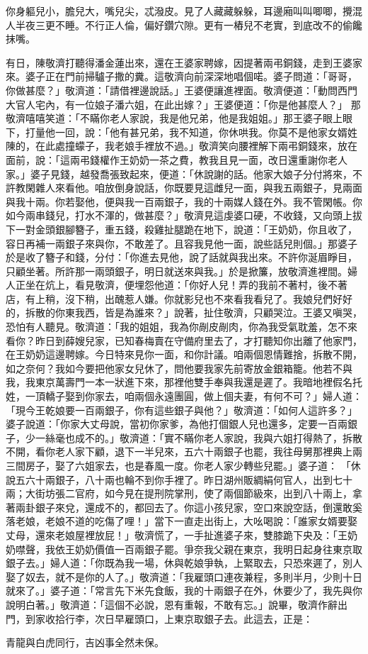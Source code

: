 你身軀兒小，膽兒大，嘴兒尖，忒潑皮。見了人藏藏躲躲，耳邊廂叫叫唧唧，攪混人半夜三更不睡。不行正人倫，偏好鑽穴隙。更有一樁兒不老實，到底改不的偷饞抹嘴。

有日，陳敬濟打聽得潘金蓮出來，還在王婆家聘嫁，因提著兩弔銅錢，走到王婆家來。婆子正在門前掃驢子撒的糞。這敬濟向前深深地唱個喏。婆子問道：「哥哥，你做甚麼？」敬濟道：「請借裡邊說話。」王婆便讓進裡面。敬濟便道：「動問西門大官人宅內，有一位娘子潘六姐，在此出嫁？」王婆便道：「你是他甚麼人？」 那敬濟嘻嘻笑道：「不瞞你老人家說，我是他兄弟，他是我姐姐。」那王婆子眼上眼下，打量他一回，說：「他有甚兄弟，我不知道，你休哄我。你莫不是他家女婿姓陳的，在此處撞蠓子，我老娘手裡放不過。」敬濟笑向腰裡解下兩弔銅錢來，放在面前，說：「這兩弔錢權作王奶奶一茶之費，教我且見一面，改日還重謝你老人家。」婆子見錢，越發喬張致起來，便道：「休說謝的話。他家大娘子分付將來，不許教閑雜人來看他。咱放倒身說話，你既要見這雌兒一面，與我五兩銀子，見兩面與我十兩。你若娶他，便與我一百兩銀子，我的十兩媒人錢在外。我不管閑帳。你如今兩串錢兒，打水不渾的，做甚麼？」敬濟見這虔婆口硬，不收錢，又向頭上拔下一對金頭銀腳簪子，重五錢，殺雞扯腿跪在地下，說道：「王奶奶，你且收了，容日再補一兩銀子來與你，不敢差了。且容我見他一面，說些話兒則個。」那婆子於是收了簪子和錢，分付：「你進去見他，說了話就與我出來。不許你涎眉睜目，只顧坐著。所許那一兩頭銀子，明日就送來與我。」於是掀簾，放敬濟進裡間。婦人正坐在炕上，看見敬濟，便埋怨他道：「你好人兒！弄的我前不著村，後不著店，有上稍，沒下稍，出醜惹人嫌。你就影兒也不來看我看兒了。我娘兒們好好的，拆散的你東我西，皆是為誰來？」說著，扯住敬濟，只顧哭泣。王婆又嗔哭，恐怕有人聽見。敬濟道：「我的姐姐，我為你剮皮剮肉，你為我受氣耽羞，怎不來看你？昨日到薛嫂兒家，已知春梅賣在守備府里去了，才打聽知你出離了他家門，在王奶奶這邊聘嫁。今日特來見你一面，和你計議。咱兩個恩情難捨，拆散不開，如之奈何？我如今要把他家女兒休了，問他要我家先前寄放金銀箱籠。他若不與我，我東京萬壽門一本一狀進下來，那裡他雙手奉與我還是遲了。我暗地裡假名托姓，一頂轎子娶到你家去，咱兩個永遠團圓，做上個夫妻，有何不可？」婦人道：「現今王乾娘要一百兩銀子，你有這些銀子與他？」敬濟道：「如何人這許多？」 婆子說道：「你家大丈母說，當初你家爹，為他打個銀人兒也還多，定要一百兩銀子，少一絲毫也成不的。」敬濟道：「實不瞞你老人家說，我與六姐打得熱了，拆散不開，看你老人家下顧，退下一半兒來，五六十兩銀子也罷，我往母舅那裡典上兩三間房子，娶了六姐家去，也是春風一度。你老人家少轉些兒罷。」婆子道： 「休說五六十兩銀子，八十兩也輪不到你手裡了。昨日湖州販綢絹何官人，出到七十兩；大街坊張二官府，如今見在提刑院掌刑，使了兩個節級來，出到八十兩上，拿著兩卦銀子來兌，還成不的，都回去了。你這小孩兒家，空口來說空話，倒還敢奚落老娘，老娘不道的吃傷了哩！」當下一直走出街上，大吆喝說：「誰家女婿要娶丈母，還來老娘屋裡放屁！」敬濟慌了，一手扯進婆子來，雙膝跪下央及：「王奶奶噤聲，我依王奶奶價值一百兩銀子罷。爭奈我父親在東京，我明日起身往東京取銀子去。」婦人道：「你既為我一場，休與乾娘爭執，上緊取去，只恐來遲了，別人娶了奴去，就不是你的人了。」敬濟道：「我雇頭口連夜兼程，多則半月，少則十日就來了。」婆子道：「常言先下米先食飯，我的十兩銀子在外，休要少了，我先與你說明白著。」敬濟道：「這個不必說，恩有重報，不敢有忘。」說畢，敬濟作辭出門，到家收拾行李，次日早雇頭口，上東京取銀子去。此這去，正是：

青龍與白虎同行，吉凶事全然未保。

